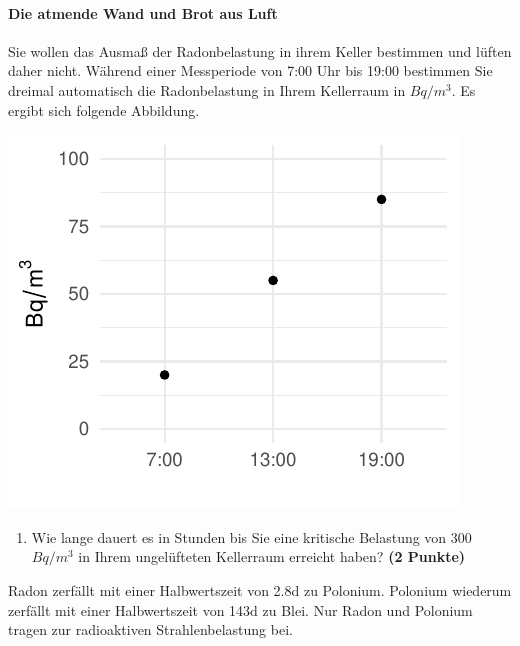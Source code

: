 \documentclass[a4paper, 10pt]{scrartcl}\usepackage[]{graphicx}\usepackage[]{xcolor}
\makeatletter
\def\maxwidth{ %
  \ifdim\Gin@nat@width>\linewidth
    \linewidth
  \else
    \Gin@nat@width
  \fi
}
\newenvironment{knitrout}{}{} %
\makeatother
\begin{document}
\paragraph{Die atmende Wand und Brot aus Luft}



Sie wollen das Ausma{\ss} der Radonbelastung in ihrem Keller bestimmen und
l{\"u}ften daher nicht. W{\"a}hrend einer Messperiode von 7:00 Uhr bis
19:00 bestimmen Sie dreimal automatisch die Radonbelastung in
Ihrem Kellerraum in $Bq/m^3$. Es ergibt sich folgende Abbildung.

\begin{knitrout}
\color{fgcolor}

{\centering \includegraphics[width=\maxwidth]{img/math-10-1} 

}


\end{knitrout}

\vspace{-0.75cm}

\begin{enumerate}
\item Wie lange dauert es in Stunden bis Sie eine kritische Belastung von
  300$Bq/m^3$ in Ihrem ungel{\"u}fteten Kellerraum erreicht haben?
  \textbf{(2 Punkte)}
\end{enumerate}

Radon zerf{\"a}llt mit einer Halbwertszeit von 2.8d zu
Polonium. Polonium wiederum zerf{\"a}llt mit einer Halbwertszeit von
143d zu Blei. Nur Radon und Polonium tragen zur
radioaktiven Strahlenbelastung bei.
\end{document}
